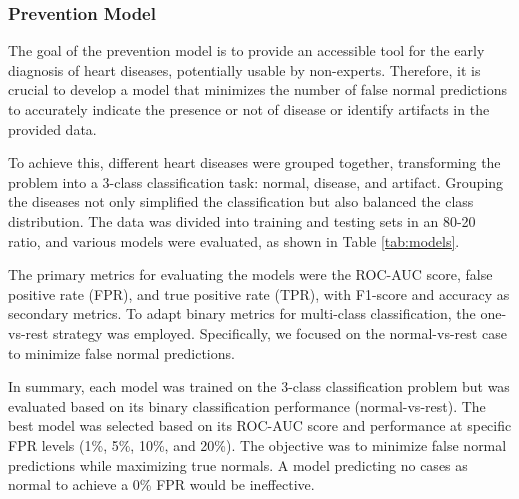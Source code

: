 \subsubsection{Prevention Model}
The goal of the prevention model is to provide an accessible tool for the early diagnosis of heart 
diseases, potentially usable by non-experts. Therefore, it is crucial to develop a model that 
minimizes the number of false normal predictions to accurately indicate the presence or not
of disease or identify artifacts in the provided data.

To achieve this, different heart diseases were grouped together, transforming the problem 
into a 3-class classification task: normal, disease, and artifact. Grouping the diseases not 
only simplified the classification but also balanced the class distribution. The data was 
divided into training and testing sets in an 80-20 ratio, and various models were evaluated, 
as shown in Table \ref{tab:models}.

The primary metrics for evaluating the models were the ROC-AUC score, false positive rate (FPR), 
and true positive rate (TPR), with F1-score and accuracy as secondary metrics. 
To adapt binary metrics for multi-class classification, the one-vs-rest strategy was employed. 
Specifically, we focused on the normal-vs-rest case to minimize false normal predictions.

In summary, each model was trained on the 3-class classification problem but was evaluated based on 
its binary classification performance (normal-vs-rest). The best model was selected based on its 
ROC-AUC score and performance at specific FPR levels (1\%, 5\%, 10\%, and 20\%). The objective was 
to minimize false normal predictions while maximizing true normals. A model predicting no cases 
as normal to achieve a 0\% FPR would be ineffective.